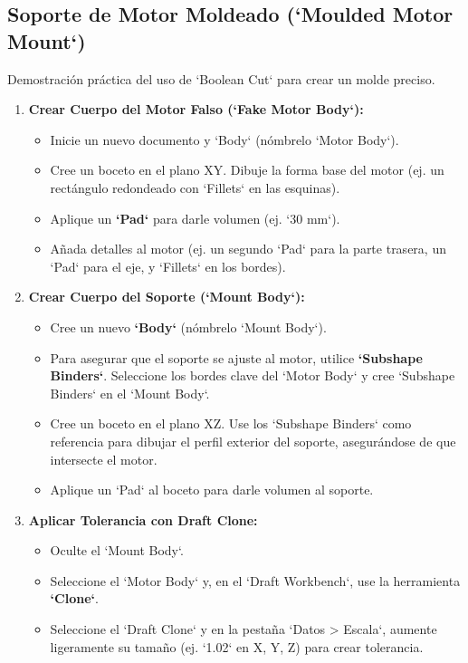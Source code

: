 \documentclass[12pt]{article}
\begin{document}
\subsection{Soporte de Motor Moldeado (`Moulded Motor Mount`)}
Demostración práctica del uso de `Boolean Cut` para crear un molde preciso.
\begin{enumerate}[label=\arabic*)]
    \item \textbf{Crear Cuerpo del Motor Falso (`Fake Motor Body`):}
    \begin{itemize}[label=\textendash]
        \item Inicie un nuevo documento y `Body` (nómbrelo `Motor Body`).
        \item Cree un boceto en el plano XY. Dibuje la forma base del motor (ej. un rectángulo redondeado con `Fillets` en las esquinas).
        \item Aplique un \textbf{`Pad`} para darle volumen (ej. `30 mm`).
        \item Añada detalles al motor (ej. un segundo `Pad` para la parte trasera, un `Pad` para el eje, y `Fillets` en los bordes).
    \end{itemize}
    \item \textbf{Crear Cuerpo del Soporte (`Mount Body`):}
    \begin{itemize}[label=\textendash]
        \item Cree un nuevo \textbf{`Body`} (nómbrelo `Mount Body`).
        \item Para asegurar que el soporte se ajuste al motor, utilice \textbf{`Subshape Binders`}. Seleccione los bordes clave del `Motor Body` y cree `Subshape Binders` en el `Mount Body`.
        \item Cree un boceto en el plano XZ. Use los `Subshape Binders` como referencia para dibujar el perfil exterior del soporte, asegurándose de que intersecte el motor.
        \item Aplique un `Pad` al boceto para darle volumen al soporte.
    \end{itemize}
    \item \textbf{Aplicar Tolerancia con Draft Clone:}
    \begin{itemize}[label=\textendash]
        \item Oculte el `Mount Body`.
        \item Seleccione el `Motor Body` y, en el `Draft Workbench`, use la herramienta \textbf{`Clone`}.
        \item Seleccione el `Draft Clone` y en la pestaña `Datos > Escala`, aumente ligeramente su tamaño (ej. `1.02` en X, Y, Z) para crear tolerancia.

\end{itemize}
\end{enumerate}
\end{document}
